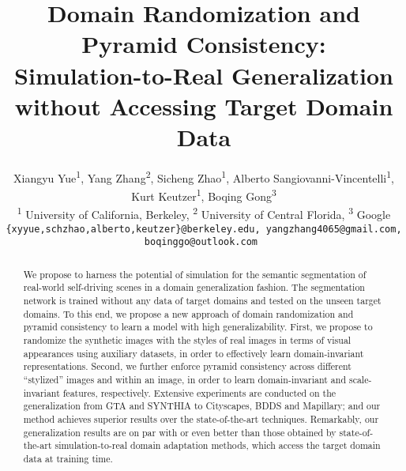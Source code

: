 \documentclass[10pt,twocolumn,letterpaper]{article}
\begin{document}
\title{Domain Randomization and Pyramid Consistency: \\Simulation-to-Real Generalization without Accessing Target Domain Data}

\author{Xiangyu Yue\textsuperscript{1}, Yang Zhang\textsuperscript{2}, Sicheng Zhao\textsuperscript{1}, Alberto Sangiovanni-Vincentelli\textsuperscript{1}, \\Kurt Keutzer\textsuperscript{1}, Boqing Gong\textsuperscript{3}\\
\textsuperscript{1} University of California, Berkeley,
\textsuperscript{2} University of Central Florida,
\textsuperscript{3} Google \\
\tt\small \{xyyue,schzhao,alberto,keutzer\}@berkeley.edu, yangzhang4065@gmail.com, boqinggo@outlook.com
}

\maketitle

\ificcvfinal\thispagestyle{empty}\fi

\begin{abstract}
We propose to harness the potential of simulation for the semantic segmentation of real-world self-driving scenes in a domain generalization fashion. The segmentation network is trained without any data of target domains and tested on the unseen target domains. To this end, we propose a new approach of domain randomization and pyramid consistency to learn a model with high generalizability. First, we propose to randomize the synthetic images with the styles of real images in terms of visual appearances using auxiliary datasets, in order to effectively learn domain-invariant representations. Second, we further enforce pyramid consistency across different ``stylized'' images and within an image, in order to learn domain-invariant and scale-invariant features, respectively. Extensive experiments are conducted on the generalization from GTA and SYNTHIA to Cityscapes, BDDS and Mapillary; and our method achieves superior results over the state-of-the-art techniques. Remarkably, our generalization results are on par with or even better than those obtained by state-of-the-art simulation-to-real domain adaptation methods, which access the target domain data at training time.

\end{abstract}

\vspace{-5mm}
\end{document}
